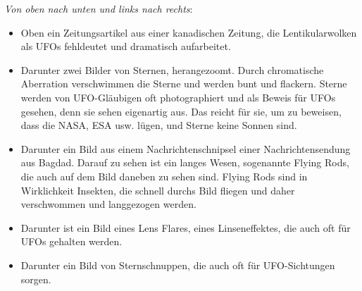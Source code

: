 \documentclass{scrartcl}
\begin{document}
\textit{Von oben nach unten und links nach rechts}:

\begin{itemize}
	\item Oben ein Zeitungsartikel aus einer kanadischen Zeitung, die Lentikularwolken als UFOs fehldeutet und dramatisch aufarbeitet.
	\item Darunter zwei Bilder von Sternen, herangezoomt. Durch chromatische Aberration verschwimmen die Sterne und werden bunt und flackern. Sterne werden von UFO-Gläubigen oft photographiert und als Beweis für UFOs gesehen, denn sie sehen eigenartig aus. Das reicht für sie, um zu beweisen, dass die NASA, ESA usw. lügen, und Sterne keine Sonnen sind.  
	\item Darunter ein Bild aus einem Nachrichtenschnipsel einer Nachrichtensendung aus Bagdad. Darauf zu sehen ist ein langes Wesen, sogenannte Flying Rods, die auch auf dem Bild daneben zu sehen sind. Flying Rods sind in Wirklichkeit Insekten, die schnell durchs Bild fliegen und daher verschwommen und langgezogen werden.
	\item Darunter ist ein Bild eines Lens Flares, eines Linseneffektes, die auch oft für UFOs gehalten werden. 
	\item Darunter ein Bild von Sternschnuppen, die auch oft für UFO-Sichtungen sorgen. 
\end{itemize}
\end{document}
